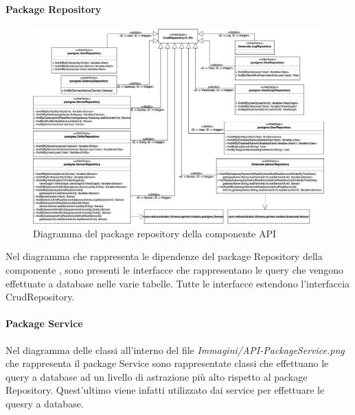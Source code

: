 		\begin{landscape}
		\paragraph*{Package Repository}
		\begin{figure}[H]
			\centering
			\includegraphics[scale=0.500]{res/images/API/RepositoryPackage.png}
			\caption{Diagramma del package repository della componente API}
			\label{Diagramma 15}
		\end{figure}
		Nel diagramma che rappresenta le dipendenze del package Repository della componente , sono presenti le interfacce che rappresentano le query che vengono effettuate a database nelle varie tabelle. Tutte le interfacce estendono l'interfaccia CrudRepository.
		\paragraph*{Package Service}
		Nel diagramma delle classi all'interno del file \textit{Immagini/API-PackageService.png} che rappresenta il package Service sono rappresentate classi che effettuano le query a database ad un livello di astrazione più alto rispetto al package Repository. Quest'ultimo viene infatti utilizzato dai service per effettuare le quesry a database.
	

\end{landscape}
